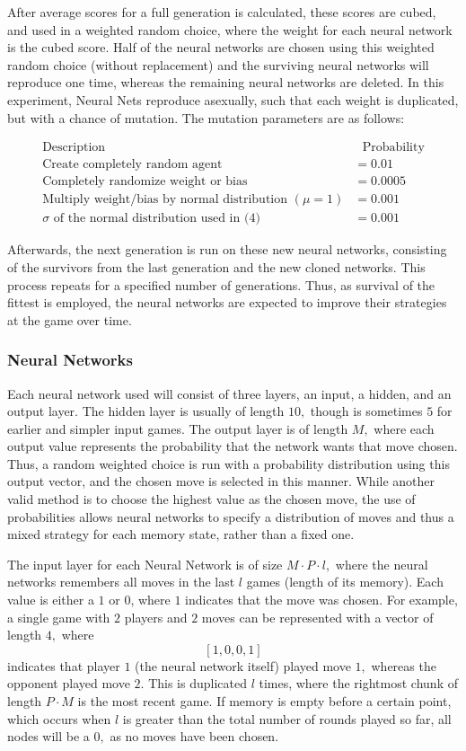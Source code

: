 \documentclass{article}
\begin{document}
After average scores for a full generation is calculated, these scores are cubed, and used in a weighted random choice, where the weight for each neural network is the cubed score. Half of the neural networks are chosen using this weighted random choice (without replacement) and the surviving neural networks will reproduce one time, whereas the remaining neural networks are deleted. In this experiment, Neural Nets reproduce asexually, such that each weight is duplicated, but with a chance of mutation. The mutation parameters are as follows:

\begin{align}
\text{Description} &\ \ \ \text{Probability}\\
\text{Create completely random agent} &= 0.01\\
\text{Completely randomize weight or bias} &= 0.0005\\
\text{Multiply weight/bias by normal distribution } (\mu=1) &= 0.001\\
\sigma\text{ of the normal distribution used in (4)} &= 0.001
\end{align}

Afterwards, the next generation is run on these new neural networks, consisting of the survivors from the last generation and the new cloned networks. This process repeats for a specified number of generations. Thus, as survival of the fittest is employed, the neural networks are expected to improve their strategies at the game over time.

\subsubsection{Neural Networks}
\label{subsubsection:NNs}

Each neural network used will consist of three layers, an input, a hidden, and an output layer. The hidden layer is usually of length $10,$ though is sometimes $5$ for earlier and simpler input games. The output layer is of length $M,$ where each output value represents the probability that the network wants that move chosen. Thus, a random weighted choice is run with a probability distribution using this output vector, and the chosen move is selected in this manner. While another valid method is to choose the highest value as the chosen move, the use of probabilities allows neural networks to specify a distribution of moves and thus a mixed strategy for each memory state, rather than a fixed one.

The input layer for each Neural Network is of size $M\cdot P \cdot l,$ where the neural networks remembers all moves in the last $l$ games (length of its memory). Each value is either a $1$ or $0$, where $1$ indicates that the move was chosen. For example, a single game with $2$ players and $2$ moves can be represented with a vector of length $4,$ where $$[1,0,0,1]$$ indicates that player $1$ (the neural network itself) played move $1,$ whereas the opponent played move $2.$ This is duplicated $l$ times, where the rightmost chunk of length $P\cdot M$ is the most recent game. If memory is empty before a certain point, which occurs when $l$ is greater than the total number of rounds played so far, all nodes will be a $0,$ as no moves have been chosen.
\end{document}
